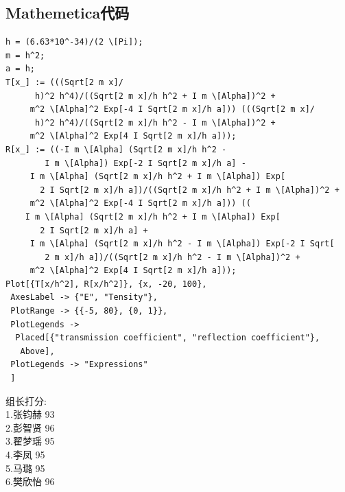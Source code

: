 \documentclass[12pt, a4paper, oneside]{ctexart}
\begin{document}
\begin{spacing}{2.0}
\subsection{Mathemetica代码}
\begin{lstlisting}
h = (6.63*10^-34)/(2 \[Pi]);
m = h^2;
a = h;
T[x_] := (((Sqrt[2 m x]/
      h)^2 h^4)/((Sqrt[2 m x]/h h^2 + I m \[Alpha])^2 + 
     m^2 \[Alpha]^2 Exp[-4 I Sqrt[2 m x]/h a])) (((Sqrt[2 m x]/
      h)^2 h^4)/((Sqrt[2 m x]/h h^2 - I m \[Alpha])^2 + 
     m^2 \[Alpha]^2 Exp[4 I Sqrt[2 m x]/h a]));
R[x_] := ((-I m \[Alpha] (Sqrt[2 m x]/h h^2 - 
        I m \[Alpha]) Exp[-2 I Sqrt[2 m x]/h a] - 
     I m \[Alpha] (Sqrt[2 m x]/h h^2 + I m \[Alpha]) Exp[
       2 I Sqrt[2 m x]/h a])/((Sqrt[2 m x]/h h^2 + I m \[Alpha])^2 + 
     m^2 \[Alpha]^2 Exp[-4 I Sqrt[2 m x]/h a])) ((
    I m \[Alpha] (Sqrt[2 m x]/h h^2 + I m \[Alpha]) Exp[
       2 I Sqrt[2 m x]/h a] + 
     I m \[Alpha] (Sqrt[2 m x]/h h^2 - I m \[Alpha]) Exp[-2 I Sqrt[
        2 m x]/h a])/((Sqrt[2 m x]/h h^2 - I m \[Alpha])^2 + 
     m^2 \[Alpha]^2 Exp[4 I Sqrt[2 m x]/h a]));
Plot[{T[x/h^2], R[x/h^2]}, {x, -20, 100},
 AxesLabel -> {"E", "Tensity"},
 PlotRange -> {{-5, 80}, {0, 1}},
 PlotLegends -> 
  Placed[{"transmission coefficient", "reflection coefficient"}, 
   Above],
 PlotLegends -> "Expressions"
 ]

\end{lstlisting}
组长打分: \\
1.张钧赫 93\\
2.彭智贤 96\\
3.翟梦瑶 95\\
4.李凤   95\\
5.马璐   95\\
6.樊欣怡 96\\
\end{spacing}



\end{document}
